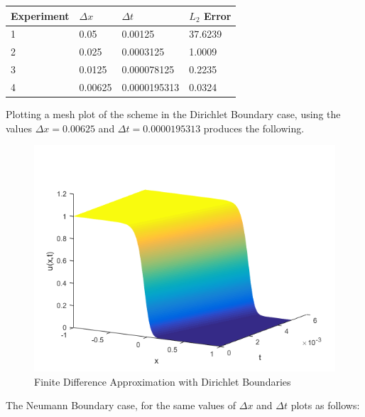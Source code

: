 \documentclass[a4paper]{article}
\begin{document}
    	\begin{table}[H]
            \begin{tabular}{|l|l|l|l|}
            \hline
            Experiment & $\Delta x$ & $\Delta t$   & $L_2$ Error \\ \hline
            1          & 0.05       & 0.00125      & 37.6239\\ \hline
            2          & 0.025      & 0.0003125    & 1.0009\\ \hline
            3          & 0.0125     & 0.000078125  & 0.2235\\ \hline
            4          & 0.00625    & 0.0000195313 & 0.0324\\ \hline
            \end{tabular}
        \end{table}
    Plotting a mesh plot of the scheme in the Dirichlet Boundary case, using the values $\Delta x = 0.00625$ and $\Delta t = 0.0000195313$ produces the following.
    \begin{figure}[H]
    \caption{Finite Difference Approximation with Dirichlet Boundaries}
    \includegraphics[scale=0.8]{Fisher_Dirichlet_FiniteDifference.png}
    \end{figure}
    The Neumann Boundary case, for the same values of $\Delta x$ and $\Delta t$ plots as follows:
\end{document}
